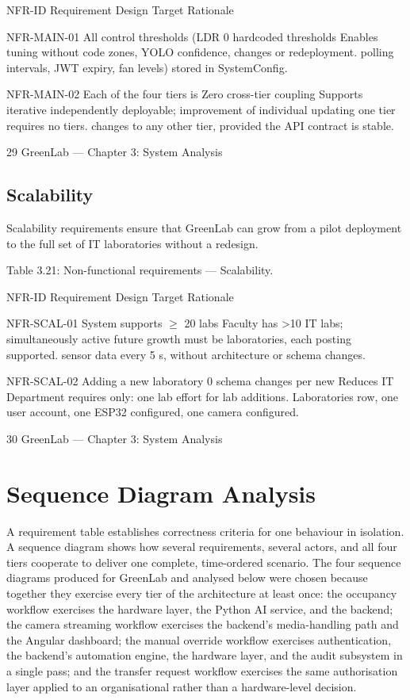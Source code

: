 NFR-ID Requirement Design Target Rationale

NFR-MAIN-01 All control thresholds (LDR 0 hardcoded thresholds Enables tuning without code
zones, YOLO confidence, changes or redeployment.
polling intervals, JWT
expiry, fan levels) stored in
SystemConfig.

NFR-MAIN-02 Each of the four tiers is Zero cross-tier coupling Supports iterative
independently deployable; improvement of individual
updating one tier requires no tiers.
changes to any other tier,
provided the API contract is
stable.




29
GreenLab --- Chapter 3: System Analysis


\subsection{Scalability}

Scalability requirements ensure that GreenLab can grow from a pilot deployment to the full set of
IT laboratories without a redesign.

Table 3.21: Non-functional requirements --- Scalability.

NFR-ID Requirement Design Target Rationale

NFR-SCAL-01 System supports $\ge$ 20 labs Faculty has >10 IT labs;
simultaneously active future growth must be
laboratories, each posting supported.
sensor data every 5 s,
without architecture or
schema changes.

NFR-SCAL-02 Adding a new laboratory 0 schema changes per new Reduces IT Department
requires only: one lab effort for lab additions.
Laboratories row, one user
account, one ESP32
configured, one camera
configured.




30
GreenLab --- Chapter 3: System Analysis



\section{Sequence Diagram Analysis}

A requirement table establishes correctness criteria for one behaviour in isolation. A sequence
diagram shows how several requirements, several actors, and all four tiers cooperate to deliver one
complete, time-ordered scenario. The four sequence diagrams produced for GreenLab and analysed
below were chosen because together they exercise every tier of the architecture at least once: the
occupancy workflow exercises the hardware layer, the Python AI service, and the backend; the
camera streaming workflow exercises the backend's media-handling path and the Angular
dashboard; the manual override workflow exercises authentication, the backend's automation
engine, the hardware layer, and the audit subsystem in a single pass; and the transfer request
workflow exercises the same authorisation layer applied to an organisational rather than a
hardware-level decision.


